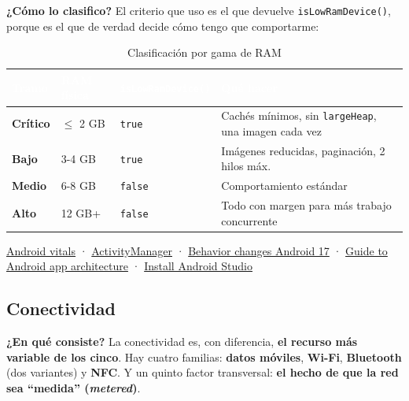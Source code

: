 \documentclass[11pt,a4paper]{article}
\newcommand{\code}[1]{\texttt{\color{primary}#1}}
\newcommand{\campo}[1]{\textbf{\color{primary}#1}}
\begin{document}
	\campo{¿Cómo lo clasifico?}
	El criterio que uso es el que devuelve \code{isLowRamDevice()}, porque es el que de verdad decide cómo tengo que comportarme:
	
	\begin{table}[htbp]
		\centering
		\small
		\begin{tabularx}{\textwidth}{@{}l l l >{\RaggedRight\arraybackslash}X@{}}
			\toprule
			\rowcolor{primary}
			\textcolor{white}{\sffamily\bfseries Tramo} & \textcolor{white}{\sffamily\bfseries RAM física} & \textcolor{white}{\sffamily\bfseries \code{isLowRamDevice()}} & \textcolor{white}{\sffamily\bfseries Qué hacer} \\
			\midrule
			\textbf{Crítico} & $\leq$ 2 GB & \code{true} & Cachés mínimos, sin \code{largeHeap}, una imagen cada vez \\
			\rowcolor{soft}
			\textbf{Bajo} & 3-4 GB & \code{true} & Imágenes reducidas, paginación, 2 hilos máx. \\
			\textbf{Medio} & 6-8 GB & \code{false} & Comportamiento estándar \\
			\rowcolor{soft}
			\textbf{Alto} & 12 GB+ & \code{false} & Todo con margen para más trabajo concurrente \\
			\bottomrule
		\end{tabularx}
		\caption{Clasificación por gama de RAM}
	\end{table}
	
	\begin{fuentesbox}
		\href{https://developer.android.com/topic/performance/vitals}{Android vitals} ·
		\href{https://developer.android.com/reference/android/app/ActivityManager}{ActivityManager} ·
		\href{https://developer.android.com/about/versions/17/behavior-changes-all}{Behavior changes Android 17} ·
		\href{https://developer.android.com/topic/libraries/architecture}{Guide to Android app architecture} ·
		\href{https://developer.android.com/studio/install}{Install Android Studio}
	\end{fuentesbox}
	
	\subsection{Conectividad}
	
	\campo{¿En qué consiste?}
	La conectividad es, con diferencia, \textbf{el recurso más variable de los cinco}. Hay cuatro familias: \textbf{datos móviles}, \textbf{Wi-Fi}, \textbf{Bluetooth} (dos variantes) y \textbf{NFC}. Y un quinto factor transversal: \textbf{el hecho de que la red sea \enquote{medida} (\emph{metered})}.
	
\end{document}
